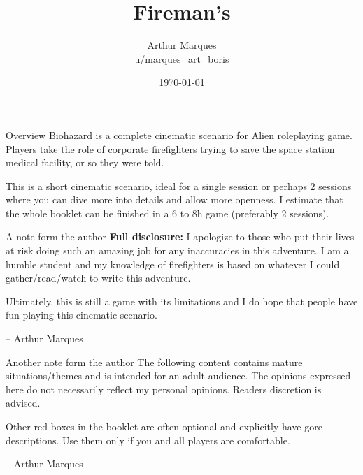 \documentclass[10pt,twoside,twocolumn]{book}
\title{Fireman's}
\date{\today}
\author{Arthur Marques \\ u/marques\_art\_boris}
\begin{document}
\selectfont %
\frontmatter

\maketitle


\begin{rpg-commentbox}{Overview}
  Biohazard is a complete cinematic scenario for Alien roleplaying game. Players take the role of corporate firefighters trying to save the space station medical facility, or so they were told.

  This is a short cinematic scenario, ideal for a single session or perhaps 2 sessions where you can dive more into details and allow more openness. I estimate that the whole booklet can be finished in a 6 to 8h game (preferably 2 sessions).
\end{rpg-commentbox}



\medskip
\begin{rpg-commentbox}{A note form the author}
  \textbf{Full disclosure:} I apologize to those who put their lives at risk doing such an amazing job for any inaccuracies in this adventure. I am a humble student and my knowledge of firefighters is based on whatever I could gather/read/watch to write this adventure. 
  
  Ultimately, this is still a game with its limitations and I do hope that people have fun playing this cinematic scenario.
  \begin{flushright}
  -- Arthur Marques
  \end{flushright}
\end{rpg-commentbox}



\begin{rpg-warnbox}{Another note form the author}
  The following content contains mature situations/themes and is intended for an adult audience. The opinions expressed here do not necessarily reflect my personal opinions. Readers discretion is advised.

  Other red boxes in the booklet are often optional and explicitly have gore descriptions. Use them only if you and all players are comfortable.

  \begin{flushright}
  -- Arthur Marques
  \end{flushright}
\end{rpg-warnbox}
\end{document}
